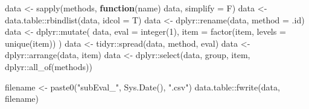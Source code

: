 \documentclass[
]{article}
\newenvironment{Shaded}{\begin{snugshade}}{\end{snugshade}}
\newcommand{\AttributeTok}[1]{\textcolor[rgb]{0.77,0.63,0.00}{#1}}
\newcommand{\ControlFlowTok}[1]{\textcolor[rgb]{0.13,0.29,0.53}{\textbf{#1}}}
\newcommand{\DecValTok}[1]{\textcolor[rgb]{0.00,0.00,0.81}{#1}}
\newcommand{\FunctionTok}[1]{\textcolor[rgb]{0.00,0.00,0.00}{#1}}
\newcommand{\NormalTok}[1]{#1}
\newcommand{\OtherTok}[1]{\textcolor[rgb]{0.56,0.35,0.01}{#1}}
\newcommand{\SpecialCharTok}[1]{\textcolor[rgb]{0.00,0.00,0.00}{#1}}
\newcommand{\StringTok}[1]{\textcolor[rgb]{0.31,0.60,0.02}{#1}}
\begin{document}
\begin{Shaded}
\begin{Highlighting}[]
\NormalTok{data }\OtherTok{\textless{}{-}} \FunctionTok{sapply}\NormalTok{(methods, }\ControlFlowTok{function}\NormalTok{(name) data, }\AttributeTok{simplify =}\NormalTok{ F)}
\NormalTok{data }\OtherTok{\textless{}{-}}\NormalTok{ data.table}\SpecialCharTok{::}\FunctionTok{rbindlist}\NormalTok{(data, }\AttributeTok{idcol =}\NormalTok{ T)}
\NormalTok{data }\OtherTok{\textless{}{-}}\NormalTok{ dplyr}\SpecialCharTok{::}\FunctionTok{rename}\NormalTok{(data, }\AttributeTok{method =}\NormalTok{ .id)}
\NormalTok{data }\OtherTok{\textless{}{-}}\NormalTok{ dplyr}\SpecialCharTok{::}\FunctionTok{mutate}\NormalTok{(}
\NormalTok{  data, }\AttributeTok{eval =} \FunctionTok{integer}\NormalTok{(}\DecValTok{1}\NormalTok{), }
  \AttributeTok{item =} \FunctionTok{factor}\NormalTok{(item, }\AttributeTok{levels =} \FunctionTok{unique}\NormalTok{(item))}
\NormalTok{)}
\NormalTok{data }\OtherTok{\textless{}{-}}\NormalTok{ tidyr}\SpecialCharTok{::}\FunctionTok{spread}\NormalTok{(data, method, eval)}
\NormalTok{data }\OtherTok{\textless{}{-}}\NormalTok{ dplyr}\SpecialCharTok{::}\FunctionTok{arrange}\NormalTok{(data, item)}
\NormalTok{data }\OtherTok{\textless{}{-}}\NormalTok{ dplyr}\SpecialCharTok{::}\FunctionTok{select}\NormalTok{(data, group, item, dplyr}\SpecialCharTok{::}\FunctionTok{all\_of}\NormalTok{(methods))}

\NormalTok{filename }\OtherTok{\textless{}{-}} \FunctionTok{paste0}\NormalTok{(}\StringTok{"subEval\_"}\NormalTok{, }\FunctionTok{Sys.Date}\NormalTok{(), }\StringTok{".csv"}\NormalTok{)}
\NormalTok{data.table}\SpecialCharTok{::}\FunctionTok{fwrite}\NormalTok{(data, filename)}
\end{Highlighting}
\end{Shaded}
\end{document}
